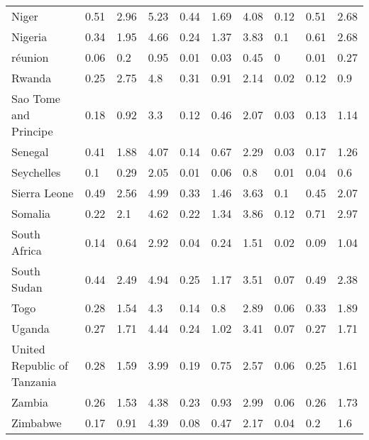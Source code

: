 \begin{longtable}[t]{llllllllll}
Niger & 0.51 & 2.96 & 5.23 & 0.44 & 1.69 & 4.08 & 0.12 & 0.51 & 2.68\\
Nigeria & 0.34 & 1.95 & 4.66 & 0.24 & 1.37 & 3.83 & 0.1 & 0.61 & 2.68\\
réunion & 0.06 & 0.2 & 0.95 & 0.01 & 0.03 & 0.45 & 0 & 0.01 & 0.27\\
Rwanda & 0.25 & 2.75 & 4.8 & 0.31 & 0.91 & 2.14 & 0.02 & 0.12 & 0.9\\
Sao Tome and Principe & 0.18 & 0.92 & 3.3 & 0.12 & 0.46 & 2.07 & 0.03 & 0.13 & 1.14\\
Senegal & 0.41 & 1.88 & 4.07 & 0.14 & 0.67 & 2.29 & 0.03 & 0.17 & 1.26\\
Seychelles & 0.1 & 0.29 & 2.05 & 0.01 & 0.06 & 0.8 & 0.01 & 0.04 & 0.6\\
Sierra Leone & 0.49 & 2.56 & 4.99 & 0.33 & 1.46 & 3.63 & 0.1 & 0.45 & 2.07\\
Somalia & 0.22 & 2.1 & 4.62 & 0.22 & 1.34 & 3.86 & 0.12 & 0.71 & 2.97\\
South Africa & 0.14 & 0.64 & 2.92 & 0.04 & 0.24 & 1.51 & 0.02 & 0.09 & 1.04\\
South Sudan & 0.44 & 2.49 & 4.94 & 0.25 & 1.17 & 3.51 & 0.07 & 0.49 & 2.38\\
Togo & 0.28 & 1.54 & 4.3 & 0.14 & 0.8 & 2.89 & 0.06 & 0.33 & 1.89\\
Uganda & 0.27 & 1.71 & 4.44 & 0.24 & 1.02 & 3.41 & 0.07 & 0.27 & 1.71\\
United Republic of Tanzania & 0.28 & 1.59 & 3.99 & 0.19 & 0.75 & 2.57 & 0.06 & 0.25 & 1.61\\
Zambia & 0.26 & 1.53 & 4.38 & 0.23 & 0.93 & 2.99 & 0.06 & 0.26 & 1.73\\
Zimbabwe & 0.17 & 0.91 & 4.39 & 0.08 & 0.47 & 2.17 & 0.04 & 0.2 & 1.6\\*
\end{longtable}
\endgroup{}
